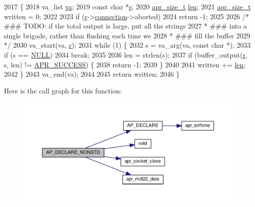 \begin{DoxyCode}
2017 \{
2018     va\_list \hyperlink{group__APR__Util__Bucket__Brigades_gafa1ac2f9aa9e56e3f87cbc5324a3114f}{va};
2019     \textcolor{keyword}{const} \textcolor{keywordtype}{char} *\hyperlink{group__APACHE__CORE__LISTEN_ga9359ed159c8b295541e3770172d34550}{s};
2020     \hyperlink{group__apr__platform_gaaa72b2253f6f3032cefea5712a27540e}{apr\_size\_t} \hyperlink{group__APACHE__CORE__LOG_gab5a43233d60ef05c5b5bf5cba3d74468}{len};
2021     \hyperlink{group__apr__platform_gaaa72b2253f6f3032cefea5712a27540e}{apr\_size\_t} written = 0;
2022 
2023     \textcolor{keywordflow}{if} (\hyperlink{group__APACHE__CORE__CONFIG_ga091cdd45984e865a888a4f8bb8fe107a}{r}->\hyperlink{structrequest__rec_a0924aae55826638314f76952ca5d60b1}{connection}->aborted)
2024         \textcolor{keywordflow}{return} -1;
2025 
2026     \textcolor{comment}{/* ### TODO: if the total output is large, put all the strings}
2027 \textcolor{comment}{     * ### into a single brigade, rather than flushing each time we}
2028 \textcolor{comment}{     * ### fill the buffer}
2029 \textcolor{comment}{     */}
2030     va\_start(va, \hyperlink{group__APACHE__CORE__CONFIG_ga091cdd45984e865a888a4f8bb8fe107a}{r});
2031     \textcolor{keywordflow}{while} (1) \{
2032         s = va\_arg(va, \textcolor{keyword}{const} \textcolor{keywordtype}{char} *);
2033         \textcolor{keywordflow}{if} (s == \hyperlink{pcre_8txt_ad7f989d16aa8ca809a36bc392c07fba1}{NULL})
2034             \textcolor{keywordflow}{break};
2035 
2036         len = strlen(s);
2037         \textcolor{keywordflow}{if} (buffer\_output(\hyperlink{group__APACHE__CORE__CONFIG_ga091cdd45984e865a888a4f8bb8fe107a}{r}, s, len) != \hyperlink{group__apr__errno_ga9ee311b7bf1c691dc521d721339ee2a6}{APR\_SUCCESS}) \{
2038             \textcolor{keywordflow}{return} -1;
2039         \}
2040 
2041         written += \hyperlink{group__APACHE__CORE__LOG_gab5a43233d60ef05c5b5bf5cba3d74468}{len};
2042     \}
2043     va\_end(va);
2044 
2045     \textcolor{keywordflow}{return} written;
2046 \}
\end{DoxyCode}


Here is the call graph for this function\+:
\nopagebreak
\begin{figure}[H]
\begin{center}
\leavevmode
\includegraphics[width=350pt]{group__MOD__CORE_ga08131eb63e0f403de9ebc2023acda159_cgraph}
\end{center}
\end{figure}


